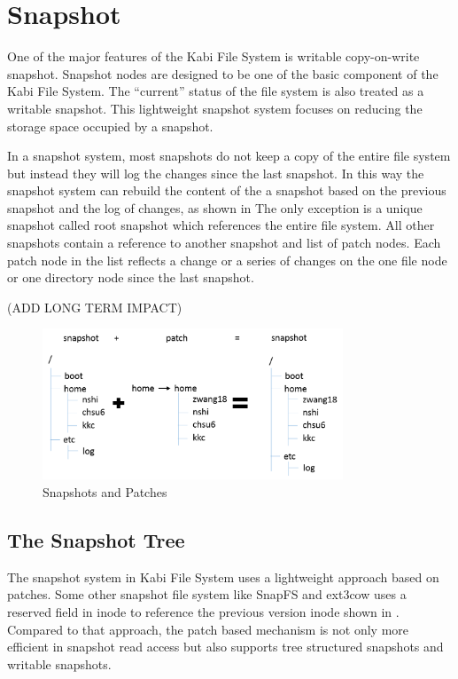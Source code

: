 \chapter{Snapshot}
\label{chap:snapshot}
    One of the major features of the Kabi File System is writable copy-on-write snapshot. Snapshot nodes are designed to be one of the basic component of the Kabi File System. The “current” status of the file system is also treated as a writable snapshot. This lightweight snapshot system focuses on reducing the storage space occupied by a snapshot.

    In a snapshot system, most snapshots do not keep a copy of the entire file system but instead they will log the changes since the last snapshot. In this way the snapshot system can rebuild the content of the a snapshot based on the previous snapshot and the log of changes, as shown in  The only exception is a unique snapshot called root snapshot which references the entire file system. All other snapshots contain a reference to another snapshot and list of patch nodes. Each patch node in the list reflects a change or a series of changes on the one file node or one directory node since the last snapshot.

    (ADD LONG TERM IMPACT)

\begin{figure}[hbtp]
\centering
\includegraphics[width=0.8\textwidth]{Chapter-4/figs/fig23.png}
\caption{Snapshots and Patches}
\label{fig:snapshot_patch}
\end{figure}

\section{The Snapshot Tree}

	The snapshot system in Kabi File System uses a lightweight approach based on patches. Some other snapshot file system like SnapFS and ext3cow uses a reserved field in inode to reference the previous version inode shown in . Compared to that approach, the patch based mechanism is not only more efficient in snapshot read access but also supports tree structured snapshots and writable snapshots.

